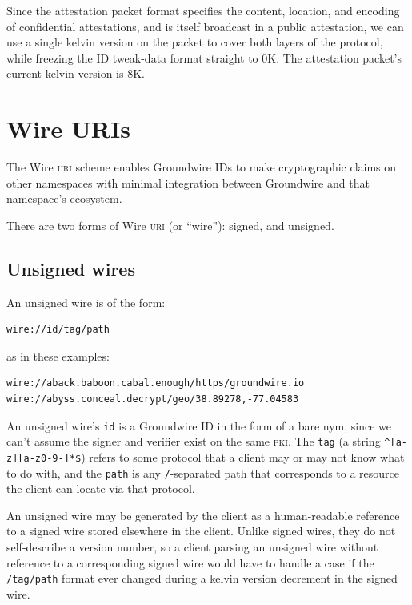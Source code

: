 \documentclass[twoside]{article}
\begin{document}
Since the attestation packet format specifies the content, location, and
encoding of confidential attestations, and is itself broadcast in a
public attestation, we can use a single kelvin version on the packet to
cover both layers of the protocol, while freezing the ID tweak-data
format straight to 0K. The attestation packet's current kelvin version
is 8K.

\section[Wire \textsc{uri}s]{Wire URIs}\label{wire-uris}

The Wire \textsc{uri} scheme enables Groundwire IDs to make cryptographic claims
on other namespaces with minimal integration between Groundwire and that
namespace's ecosystem.

There are two forms of Wire \textsc{uri} (or ``wire''): signed, and unsigned.

\subsection{Unsigned wires}\label{unsigned-wires}

An unsigned wire is of the form:

\begin{lstlisting}[style=listingcode]
wire://id/tag/path
\end{lstlisting}

\noindent
as in these examples:

\begin{lstlisting}[style=listingcode]
wire://aback.baboon.cabal.enough/https/groundwire.io
wire://abyss.conceal.decrypt/geo/38.89278,-77.04583
\end{lstlisting}

An unsigned wire's \texttt{id} is a Groundwire ID in the form of a bare
nym, since we can't assume the signer and verifier exist on the same
\textsc{pki}. The \texttt{tag} (a string \texttt{\^{}{[}a-z{]}{[}a-z0-9-{]}*\$})
refers to some protocol that a client may or may not know what to do
with, and the \texttt{path} is any \texttt{/}-separated path that
corresponds to a resource the client can locate via that protocol.

An unsigned wire may be generated by the client as a human-readable reference to a
signed wire stored elsewhere in the client. Unlike signed wires, they do
not self-describe a version number, so a client parsing an unsigned wire
without reference to a corresponding signed wire would have to handle a
case if the \texttt{/tag/path} format ever changed during a kelvin version decrement in the
signed wire.
\end{document}
